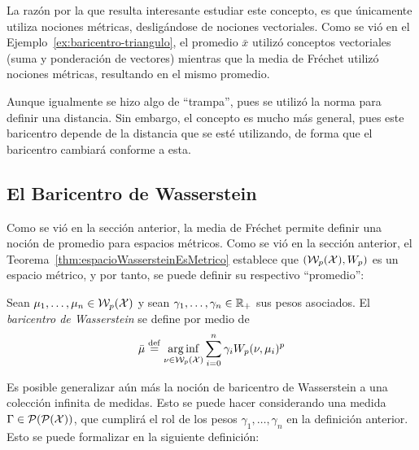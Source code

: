 {{{{				\begin{remark}
					La razón por la que resulta interesante estudiar este concepto, es que únicamente utiliza nociones métricas, desligándose de nociones vectoriales. Como se vió en el Ejemplo~\ref{ex:baricentro-triangulo}, el promedio $\bar x$ utilizó conceptos vectoriales (suma y ponderación de vectores) mientras que la media de Fréchet utilizó nociones métricas, resultando en el mismo promedio.

					Aunque igualmente se hizo algo de ``trampa'', pues se utilizó la norma para definir una distancia. Sin embargo, el concepto es mucho más general, pues este baricentro depende de la distancia que se esté utilizando, de forma que el baricentro cambiará conforme a esta.
				\end{remark}

			}  %

			\subsection*{El Baricentro de Wasserstein}\label{ssec:el-baricentro-de-Wasserstein}
			{
				Como se vió en la sección anterior, la media de Fréchet permite definir una noción de promedio para espacios métricos. Como se vió en la sección anterior, el Teorema~\ref{thm:espacioWassersteinEsMetrico} establece que $(\WassersteinSpace[p]{\cX}, W_p)$ es un espacio métrico, y por tanto, se puede definir su respectivo ``promedio'':

				\begin{definition}
					Sean $\mu_1,\ldots, \mu_n \in \WassersteinSpace[p]{\cX} $ y sean $\gamma_1,\ldots, \gamma_n \in \R_+$ sus pesos asociados. El \emph{baricentro de Wasserstein} se define por medio de
					\begin{equation}
						\bar \mu \eqdef \arginf_{\nu \in \WassersteinSpace[p]{\cX} } \sum_{i=0}^{n} \gamma_i \Wasserstein[p]{\nu}{\mu_i}^p
					\end{equation}

				\end{definition}

				Es posible generalizar aún más la noción de baricentro de Wasserstein a una colección infinita de medidas. Esto se puede hacer considerando una medida $\Gamma \in \ProbSpace[\ProbSpace ] $, que cumplirá el rol de los pesos $\gamma_1,\ldots, \gamma_n $ en la definición anterior. Esto se puede formalizar en la siguiente definición:

}}}}
